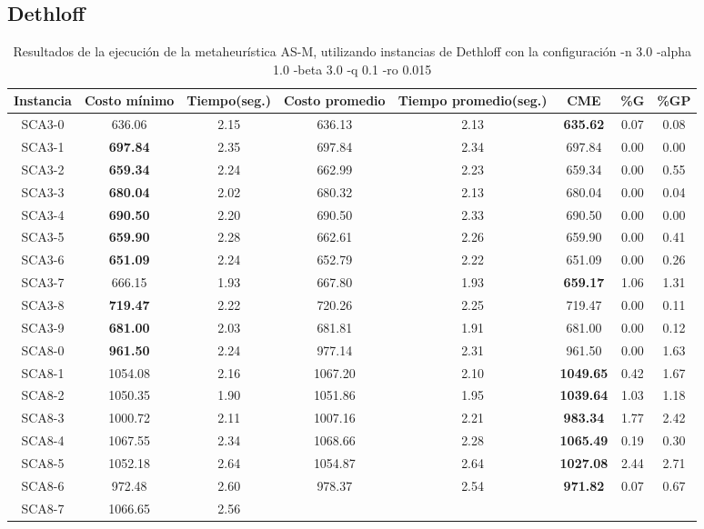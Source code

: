 \subsection{Dethloff}\label{tablas-entonacion-AS-M-dethloff}
\begin{table}[h]
\caption{Resultados de la ejecución de la metaheurística AS-M, utilizando instancias de Dethloff con la configuración -n 3.0 -alpha 1.0 -beta 3.0 -q 0.1 -ro 0.015}
\centering
\small
\begin{tabular}{c c c c c c c c}
\hline\hline
Instancia & Costo mínimo & Tiempo(seg.) & Costo promedio & Tiempo promedio(seg.) & CME & \%G & \%GP \\ [0.5ex]
\hline
SCA3-0 & 636.06 & 2.15 & 
636.13 & 2.13 & \bf{635.62} & 
0.07 & 0.08\\SCA3-1 & \bf{697.84} & 2.35 & 
697.84 & 2.34 & 697.84 & 0.00
 & 0.00\\
SCA3-2 & \bf{659.34} & 2.24 & 
662.99 & 2.23 & 659.34 & 0.00
 & 0.55\\SCA3-3 & \bf{680.04} & 2.02 & 
680.32 & 2.13 & 680.04 & 0.00
 & 0.04\\SCA3-4 & \bf{690.50} & 2.20 & 
690.50 & 2.33 & 690.50 & 0.00
 & 0.00\\
SCA3-5 & \bf{659.90} & 2.28 & 
662.61 & 2.26 & 659.90 & 0.00
 & 0.41\\SCA3-6 & \bf{651.09} & 2.24 & 
652.79 & 2.22 & 651.09 & 0.00
 & 0.26\\SCA3-7 & 666.15 & 1.93 & 
667.80 & 1.93 & \bf{659.17} & 
1.06 & 1.31\\SCA3-8 & \bf{719.47} & 2.22 & 
720.26 & 2.25 & 719.47 & 0.00
 & 0.11\\SCA3-9 & \bf{681.00} & 2.03 & 
681.81 & 1.91 & 681.00 & 0.00
 & 0.12\\SCA8-0 & \bf{961.50} & 2.24 & 
977.14 & 2.31 & 961.50 & 0.00
 & 1.63\\SCA8-1 & 1054.08 & 2.16 & 
1067.20 & 2.10 & \bf{1049.65} & 
0.42 & 1.67\\SCA8-2 & 1050.35 & 1.90 & 
1051.86 & 1.95 & \bf{1039.64} & 
1.03 & 1.18\\SCA8-3 & 1000.72 & 2.11 & 
1007.16 & 2.21 & \bf{983.34} & 
1.77 & 2.42\\SCA8-4 & 1067.55 & 2.34 & 
1068.66 & 2.28 & \bf{1065.49} & 
0.19 & 0.30\\SCA8-5 & 1052.18 & 2.64 & 
1054.87 & 2.64 & \bf{1027.08} & 
2.44 & 2.71\\SCA8-6 & 972.48 & 2.60 & 
978.37 & 2.54 & \bf{971.82} & 
0.07 & 0.67\\SCA8-7 & 1066.65 & 2.56 & 

\end{tabular}
\end{table}
